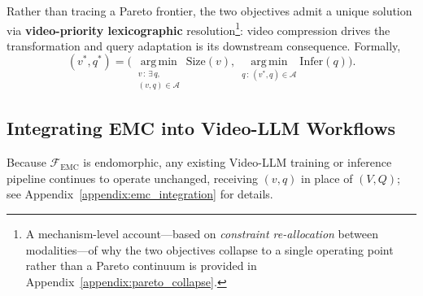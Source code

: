 Rather than tracing a Pareto frontier, the two objectives admit a unique solution via \textbf{video-priority lexicographic} resolution\footnote{A mechanism-level account---based on \textit{constraint re-allocation} between modalities---of why the two objectives collapse to a single operating point rather than a Pareto continuum is provided in Appendix~\ref{appendix:pareto_collapse}.}: video compression drives the transformation and query adaptation is its downstream consequence. Formally,
\vspace{-0.3em}
\[
(v^*, q^*) = \Big(\!\!\operatorname*{arg\,min}_{\substack{v\,:\,\exists\, q,\\ (v,q)\in\mathcal{A}}}\!\mathrm{Size}(v),\ \operatorname*{arg\,min}_{q\,:\,(v^*, q)\in\mathcal{A}}\!\mathrm{Infer}(q)\Big).
\]


\subsection{Integrating EMC into Video-LLM Workflows}
\label{subsec:emc_integration}

Because $\mathcal{F}_{\text{EMC}}$ is endomorphic, any existing Video-LLM training or inference pipeline continues to operate unchanged, receiving $(v, q)$ in place of $(V, Q)$; see Appendix~\ref{appendix:emc_integration} for details.
